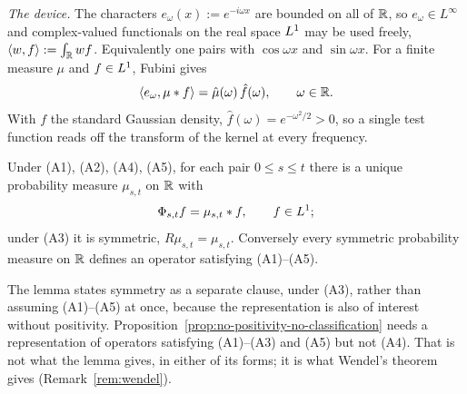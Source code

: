 \emph{The device.} The characters $e_\omega(x) := e^{-i\omega x}$ are bounded on all of $\mathbb{R}$,
so $e_\omega \in L^\infty$ and complex-valued functionals on the real space $L^1$ may be used
freely, $\langle w, f\rangle := \int_{\mathbb{R}} w f$. Equivalently one pairs with $\cos\omega x$ and
$\sin\omega x$. For a finite measure $\mu$ and $f \in L^1$, Fubini gives
\begin{equation}\label{eq:pairing}
  \langle e_\omega, \mu * f\rangle = \hat\mu(\omega)\,\hat f(\omega), \qquad \omega \in \mathbb{R} .
\end{equation}
With $f$ the standard Gaussian density, $\hat f(\omega) = e^{-\omega^2/2} > 0$, so a single
test function reads off the transform of the kernel at every frequency.

\begin{lemma}[representation]\label{lem:convolution-representation}
Under (A1), (A2), (A4), (A5), for each pair $0 \le s \le t$ there is a unique probability
measure $\mu_{s,t}$ on $\mathbb{R}$ with
\[
  \Phi_{s,t} f = \mu_{s,t} * f, \qquad f \in L^1 ;
\]
under (A3) it is symmetric, $R\mu_{s,t} = \mu_{s,t}$. Conversely every symmetric probability
measure on $\mathbb{R}$ defines an operator satisfying (A1)--(A5).
\end{lemma}

The lemma states symmetry as a separate clause, under (A3), rather than assuming
(A1)--(A5) at once, because the representation is also of interest without positivity.
Proposition~\ref{prop:no-positivity-no-classification} needs a representation of
operators satisfying (A1)--(A3) and (A5) but not (A4). That is not what the lemma gives, in
either of its forms; it is what Wendel's theorem gives (Remark~\ref{rem:wendel}).

